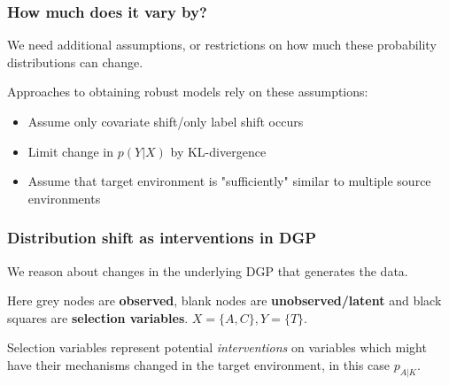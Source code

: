 \documentclass{beamer}
\begin{document}
\begin{frame}
\frametitle{How much does it vary by?}

We need additional assumptions, or restrictions on how much these probability distributions can change.
\bigskip

Approaches to obtaining robust models rely on these assumptions: 
\begin{itemize}
	\item Assume only covariate shift/only label shift occurs
	\item Limit change in $p(Y|X)$ by KL-divergence \cite{Duchi+Namkoong18}
	\item Assume that target environment is "sufficiently" similar to multiple source environments \cite{ZhangEtAl15}
\end{itemize}

\end{frame}

\begin{frame}
\frametitle{Distribution shift as interventions in DGP}
We reason about changes in the underlying DGP that generates the data.
\begin{center}
\end{center}
Here grey nodes are \textbf{observed}, blank nodes are \textbf{unobserved/latent} and black squares are \textbf{selection variables}. $X = \{A, C\}, Y = \{T\}$.
\medskip

Selection variables represent potential \textit{interventions} on variables which might have their mechanisms changed in the target environment, in this case $p_{A|K}$.
\end{frame}
\end{document}

